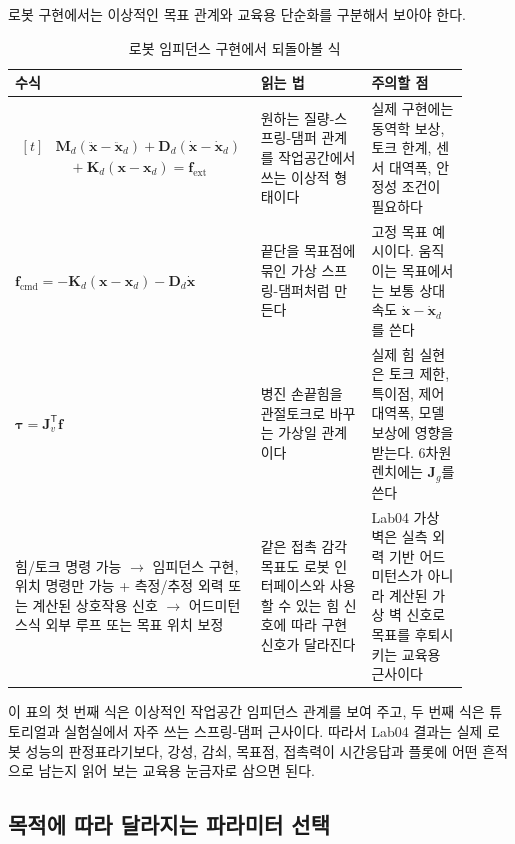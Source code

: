 로봇 구현에서는 이상적인 목표 관계와 교육용 단순화를 구분해서 보아야 한다.
\begin{table}[!htbp]
  \centering
  \caption{로봇 임피던스 구현에서 되돌아볼 식}
  \label{tab:discussion-robot-formulas}
  {\renewcommand{\arraystretch}{1.12}
  \begin{tabular}{p{0.34\linewidth}p{0.31\linewidth}p{0.25\linewidth}}
    \toprule
    수식 & 읽는 법 & 주의할 점 \\
    \midrule
    $\begin{aligned}[t]
      &\bm{M}_d(\ddot{\bm{x}}-\ddot{\bm{x}}_d)
      +\bm{D}_d(\dot{\bm{x}}-\dot{\bm{x}}_d)\\
      &\quad+\bm{K}_d(\bm{x}-\bm{x}_d)
      =\bm{f}_{\mathrm{ext}}
    \end{aligned}$ & 원하는 질량-스프링-댐퍼 관계를 작업공간에서 쓰는 이상적 형태이다 & 실제 구현에는 동역학 보상, 토크 한계, 센서 대역폭, 안정성 조건이 필요하다 \\
    $\bm{f}_{\mathrm{cmd}}=-\bm{K}_d(\bm{x}-\bm{x}_d)-\bm{D}_d\dot{\bm{x}}$ & 끝단을 목표점에 묶인 가상 스프링-댐퍼처럼 만든다 & 고정 목표 예시이다. 움직이는 목표에서는 보통 상대속도 $\dot{\bm{x}}-\dot{\bm{x}}_d$를 쓴다 \\
    $\bm{\tau}=\bm{J}_v^{\mathsf{T}}\bm{f}$ & 병진 손끝힘을 관절토크로 바꾸는 가상일 관계이다 & 실제 힘 실현은 토크 제한, 특이점, 제어 대역폭, 모델 보상에 영향을 받는다. 6차원 렌치에는 $\bm{J}_g$를 쓴다 \\
    힘/토크 명령 가능 $\rightarrow$ 임피던스 구현, 위치 명령만 가능 + 측정/추정 외력 또는 계산된 상호작용 신호 $\rightarrow$ 어드미턴스식 외부 루프 또는 목표 위치 보정 & 같은 접촉 감각 목표도 로봇 인터페이스와 사용할 수 있는 힘 신호에 따라 구현 신호가 달라진다 & Lab04 가상 벽은 실측 외력 기반 어드미턴스가 아니라 계산된 가상 벽 신호로 목표를 후퇴시키는 교육용 근사이다 \\
    \bottomrule
  \end{tabular}}
\end{table}

이 표의 첫 번째 식은 이상적인 작업공간 임피던스 관계를 보여 주고, 두 번째 식은 튜토리얼과 실험실에서 자주 쓰는 스프링-댐퍼 근사이다.
따라서 Lab04 결과는 실제 로봇 성능의 판정표라기보다, 강성, 감쇠, 목표점, 접촉력이 시간응답과 플롯에 어떤 흔적으로 남는지 읽어 보는 교육용 눈금자로 삼으면 된다.

\subsection{목적에 따라 달라지는 파라미터 선택}

